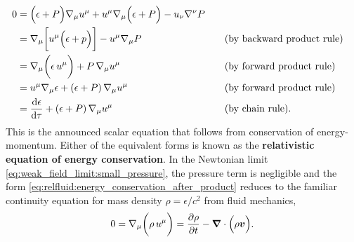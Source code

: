 \begin{subequations}
\begin{align}
	  0 &= \Big(\epsilon + P \Big) \nabla_\mu u^\mu + u^\mu \nabla_\mu \Big( \epsilon + P \Big) - u_\nu \nabla^\nu P \nonumber \\
	    &= \nabla_\mu \bigg[ u^\mu \Big( \epsilon + p \Big)  \bigg] - u^\mu \nabla_\mu P && \quad \text{(by backward product rule)} \nonumber \\
	    &= \nabla_\mu \bigg( \epsilon \, u^\mu \bigg) + P \, \nabla_\mu u^\mu && \quad \text{(by forward product rule)} \label{eq:relfluid:energy_conservation_before_product} \\
	    &= u^\mu \nabla_\mu \epsilon + \left( \epsilon + P \right) \nabla_\mu u^\mu && \quad \text{(by forward product rule)} \label{eq:relfluid:energy_conservation_after_product} \\
	    &= \odv{\epsilon}{\tau} + \left( \epsilon + P \right) \nabla_\mu u^\mu && \quad \text{(by chain rule)} . \label{eq:relfluid:energy_conservation_after_chain}
\end{align}%
\label{eq:relfluid:energy_conservation}%
\end{subequations}%
This is the announced scalar equation that follows from conservation of energy-momentum.
Either of the equivalent forms is known as the \textbf{relativistic equation of energy conservation}.
In the Newtonian limit \eqref{eq:weak_field_limit:small_pressure}, the pressure term is negligible and the form \eqref{eq:relfluid:energy_conservation_after_product} reduces to the familiar continuity equation for mass density $\rho = \epsilon / c^2$ from fluid mechanics,
\cite[equation 7.1]{ref:iver}
\begin{equation}
	0 = \nabla_\mu \bigg( \rho \, u^\mu \bigg) = \pdv{\rho}{t} - {\bm{\nabla}} \cdot \Big( \rho {\bm{v}} \Big).
\end{equation}


